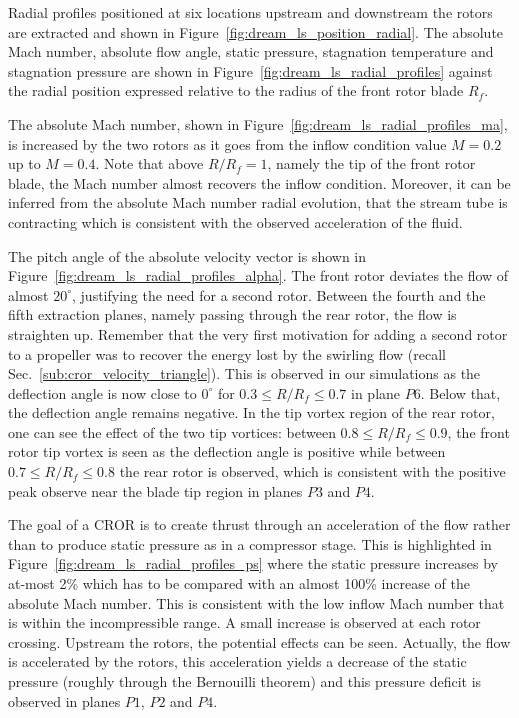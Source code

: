Radial profiles positioned at six locations upstream and downstream the rotors
are extracted and shown in Figure~\ref{fig:dream_ls_position_radial}.
The absolute
Mach number, absolute flow angle, static pressure, 
stagnation temperature and stagnation pressure
are shown in Figure~\ref{fig:dream_ls_radial_profiles}
against the radial position expressed
relative to the radius of the front rotor blade $R_f$.

The absolute Mach number, shown in 
Figure~\ref{fig:dream_ls_radial_profiles_ma}, is increased by
the two rotors as it goes from the inflow condition value $M=0.2$
up to $M=0.4$. Note that above $R/R_f=1$, namely  the tip
of the front rotor blade, the Mach number
almost recovers the inflow condition. Moreover, it can be inferred from the
absolute Mach number radial evolution, that the stream tube is contracting which is consistent
with the observed acceleration of the fluid.

The pitch angle of the absolute velocity vector is shown in 
Figure~\ref{fig:dream_ls_radial_profiles_alpha}. The front rotor
deviates the flow of almost $20^\circ$, justifying the need
for a second rotor. Between the fourth and the fifth extraction planes, namely
passing through the rear rotor, the flow is straighten up. Remember that 
the very first motivation for adding a second rotor to a propeller
was to recover the energy lost by the swirling flow
(recall Sec.~\ref{sub:cror_velocity_triangle}). This is observed in our simulations as
the deflection angle is now close to $0^\circ$ for $0.3 \leq R/R_f \leq 0.7$
in plane $P6$.
Below that, the deflection angle remains negative. In the tip vortex region
of the rear rotor, one can see the effect of the two tip vortices: between 
$0.8 \leq R/R_f \leq 0.9$, the front rotor tip vortex is seen as the 
deflection angle is positive while between $0.7 \leq R/R_f \leq 0.8$
the rear rotor is observed, 
which is consistent with the positive
peak observe near the blade tip region in planes $P3$ and $P4$.

The goal of a CROR is to create thrust through an acceleration of 
the flow rather than to produce static pressure as in a compressor stage.
This is highlighted in Figure~\ref{fig:dream_ls_radial_profiles_ps}
where the static pressure increases by at-most 2\% which has to 
be compared with an almost 100\% increase of the absolute
Mach number. This is consistent with the low inflow Mach number
that is within the incompressible range.
A small increase is observed at each
rotor crossing. Upstream the rotors, the potential effects can
be seen. Actually, the flow is accelerated by the rotors, this acceleration
yields a decrease of the static pressure 
(roughly through the Bernouilli theorem) and this pressure deficit is observed in
planes $P1$, $P2$ and $P4$.

